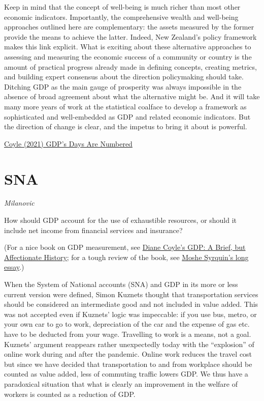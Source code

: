 \documentclass[
]{book}
\begin{document}
Keep in mind that the concept of well-being is much richer than most other economic indicators. Importantly, the comprehensive wealth and well-being approaches outlined here are complementary: the assets measured by the former provide the means to achieve the latter. Indeed, New Zealand's policy framework makes this link explicit. What is exciting about these alternative approaches to assessing and measuring the economic success of a community or country is the amount of practical progress already made in defining concepts, creating metrics, and building expert consensus about the direction policymaking should take. Ditching GDP as the main gauge of prosperity was always impossible in the absence of broad agreement about what the alternative might be. And it will take many more years of work at the statistical coalface to develop a framework as sophisticated and well-embedded as GDP and related economic indicators. But the direction of change is clear, and the impetus to bring it about is powerful.

\href{https://www.project-syndicate.org/commentary/replacing-gdp-with-wealth-and-wellbeing-indicators-by-diane-coyle-2021-12}{Coyle (2021) GDP's Days Are Numbered}

\hypertarget{sna}{%
\section{SNA}\label{sna}}

\emph{Milanovic}

How should GDP account for the use of exhaustible resources, or should it include net income from financial services and insurance?

(For a nice book on GDP measurement,
see \href{https://www.amazon.com/GDP-Affectionate-History-Revised-expanded/dp/0691169853}{Diane Coyle's GDP: A Brief, but Affectionate History};
for a tough review of the book,
see \href{https://www.ehu.eus/documents/6902252/12061410/M.+Syrquin-A+review+essay+on+GDP-2016.pdf/97290c64-2baf-e64a-1115-98060dae419a?t=1557135627000}{Moshe Syrquin's long essay}.)

When the System of National accounts (SNA) and GDP in its more or less current version were defined, Simon Kuznets thought that transportation services should be considered an intermediate good and not included in value added. This was not accepted even if Kuznets' logic was impeccable: if you use bus, metro, or your own car to go to work, depreciation of the car and the expense of gas etc. have to be deducted from your wage. Travelling to work is a means, not a goal. Kuznets' argument reappears rather unexpectedly today with the ``explosion'' of online work during and after the pandemic. Online work reduces the travel cost but since we have decided that transportation to and from workplace should be counted as value added, less of commuting traffic lowers GDP. We thus have a paradoxical situation that what is clearly an improvement in the welfare of workers is counted as a reduction of GDP.
\end{document}
